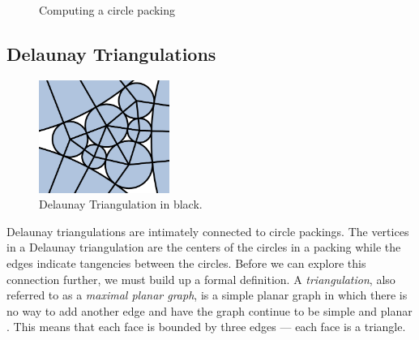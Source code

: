 \documentclass[11pt]{article}
\begin{document}
\begin{figure}%
    \centering
    \qquad
    \caption{Computing a circle packing}%
    \label{fig:inout}%
\end{figure}

\subsection{Delaunay Triangulations}

\begin{figure}
  \begin{center}
    \includegraphics[width=0.38\textwidth]{delaunayemph}
  \end{center}
  \caption{Delaunay Triangulation in black.}
\end{figure}

	Delaunay triangulations are intimately connected to circle packings. The vertices in a Delaunay triangulation are the centers of the circles in a packing while the edges indicate tangencies between the circles. Before we can explore this connection further, we must build up a formal definition.
	A \emph{triangulation}, also referred to as a \emph{maximal planar graph}, is a simple planar graph in which there is no way to add another edge and have the graph continue to be simple and planar \cite{meshGeneration}. This means that each face is bounded by three edges --- each face is a triangle.
	
\end{document}
